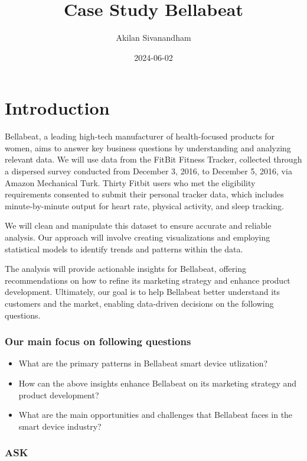\documentclass[
]{article}
\title{Case Study Bellabeat}
\author{Akilan Sivanandham}
\date{2024-06-02}
\providecommand{\tightlist}{%
  \setlength{\itemsep}{0pt}\setlength{\parskip}{0pt}}
\begin{document}
\maketitle

\section{Introduction}\label{introduction}

Bellabeat, a leading high-tech manufacturer of health-focused products
for women, aims to answer key business questions by understanding and
analyzing relevant data. We will use data from the FitBit Fitness
Tracker, collected through a dispersed survey conducted from December 3,
2016, to December 5, 2016, via Amazon Mechanical Turk. Thirty Fitbit
users who met the eligibility requirements consented to submit their
personal tracker data, which includes minute-by-minute output for heart
rate, physical activity, and sleep tracking.

We will clean and manipulate this dataset to ensure accurate and
reliable analysis. Our approach will involve creating visualizations and
employing statistical models to identify trends and patterns within the
data.

The analysis will provide actionable insights for Bellabeat, offering
recommendations on how to refine its marketing strategy and enhance
product development. Ultimately, our goal is to help Bellabeat better
understand its customers and the market, enabling data-driven decisions
on the following questions.

\subsubsection{Our main focus on following
questions}\label{our-main-focus-on-following-questions}

\begin{itemize}
\tightlist
\item
  What are the primary patterns in Bellabeat smart device utlization?
\item
  How can the above insights enhance Bellabeat on its marketing strategy
  and product development?
\item
  What are the main opportunities and challenges that Bellabeat faces in
  the smart device industry?
\end{itemize}

\subsubsection{ASK}\label{ask}
\end{document}
